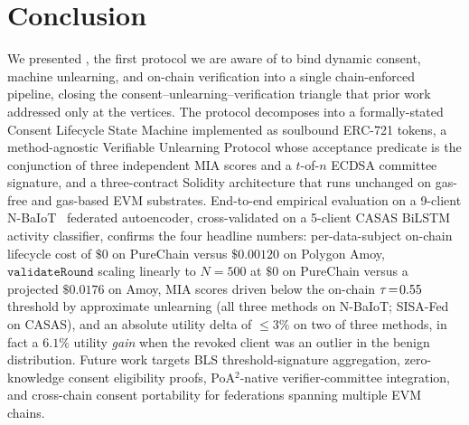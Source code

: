 \section{Conclusion}
\label{sec:conclusion}

We presented \sysname, the first protocol we are aware of to bind
dynamic consent, machine unlearning, and on-chain verification into
a single chain-enforced pipeline, closing the
consent--unlearning--verification triangle that prior work
addressed only at the vertices. The protocol decomposes into a
formally-stated Consent Lifecycle State Machine implemented as
soulbound ERC-721 tokens, a method-agnostic Verifiable Unlearning
Protocol whose acceptance predicate is the conjunction of three
independent MIA scores and a $t$-of-$n$ ECDSA committee signature,
and a three-contract Solidity architecture that runs unchanged on
gas-free and gas-based EVM substrates. End-to-end empirical
evaluation on a 9-client N-BaIoT~\cite{meidan2018nbaiot} federated
autoencoder, cross-validated on a 5-client CASAS BiLSTM activity
classifier, confirms the four headline numbers: per-data-subject
on-chain lifecycle cost of $\$0$ on PureChain versus $\$0.00120$ on
Polygon Amoy, $\texttt{validateRound}$ scaling linearly to
$N\!=\!500$ at $\$0$ on PureChain versus a projected $\$0.0176$ on
Amoy, MIA scores driven below the on-chain $\tau\!=\!0.55$
threshold by approximate unlearning (all three methods on N-BaIoT;
SISA-Fed on CASAS), and an absolute utility delta of $\le\!3\%$ on
two of three methods, in fact a $6.1\%$ utility \emph{gain} when
the revoked client was an outlier in the benign distribution. Future work targets BLS
threshold-signature aggregation, zero-knowledge consent eligibility
proofs, PoA$^2$-native verifier-committee integration, and
cross-chain consent portability for federations spanning multiple
EVM chains.
